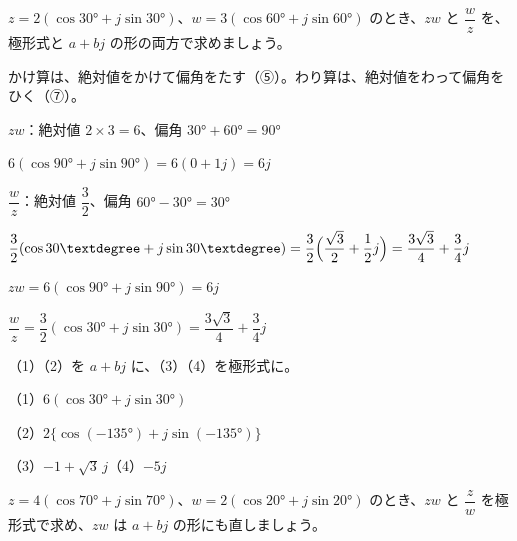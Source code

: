 \begin{reidai}
$z=2(\cos30°+j\sin30°)$、$w=3(\cos60°+j\sin60°)$ のとき、$zw$ と $\dfrac{w}{z}$ を、極形式と $a+bj$ の形の両方で求めましょう。\par
\kangaekata かけ算は、絶対値をかけて偏角をたす（⑤）。わり算は、絶対値をわって偏角をひく（⑦）。\par
\shiki{}\zw{} $zw$：絶対値 $2\times3=6$、偏角 $30°+60°=90°$\par
\bkvija $6(\cos90°+j\sin90°)=6(0+1j)=6j$\par
\bkvija $\dfrac{w}{z}$：絶対値 $\dfrac32$、偏角 $60°-30°=30°$\par
\bkvija $\dfrac32(\cos30°+j\sin30°)=\dfrac32\Bigl(\dfrac{\sqrt3}{2}+\dfrac12j\Bigr)=\dfrac{3\sqrt3}{4}+\dfrac34j$\par
\kotae{}\zw{} $zw=6(\cos90°+j\sin90°)=6j$\par
\bkvija $\dfrac{w}{z}=\dfrac32(\cos30°+j\sin30°)=\dfrac{3\sqrt3}{4}+\dfrac34j$
\end{reidai}

\noindent\begin{minipage}[t]{0.485\linewidth}\vspace{0pt}
\begin{jibun}
（1）（2）を $a+bj$ に、（3）（4）を極形式に。\par
（1）$6(\cos30°+j\sin30°)$\par
（2）$2\{\cos(-135°)+j\sin(-135°)\}$\par
（3）$-1+\sqrt3\,j$\newline（4）$-5j$
\end{jibun}
\end{minipage}\hfill
\begin{minipage}[t]{0.485\linewidth}\vspace{0pt}
\begin{jibun}
$z=4(\cos70°+j\sin70°)$、$w=2(\cos20°+j\sin20°)$ のとき、$zw$ と $\dfrac{z}{w}$ を極形式で求め、$zw$ は $a+bj$ の形にも直しましょう。
\end{jibun}
\end{minipage}

